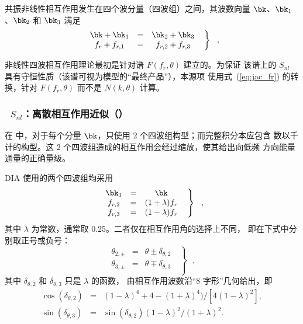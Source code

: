 
\noindent


共振非线性相互作用发生在四个波分量（四波组）之间，其波数向量
$\bk$、$\bk_1$、$\bk_2$ 和 $\bk_3$ 满足
\begin{equation} \left .
\begin{array}{ccc}
  \bk + \bk_1 & = & \bk_2 + \bk_3     \\
  f_r + f_{r,1}& =& f_{r,2} +  f_{r,3} 
\end{array} \:\:\: \right \rbrace \:\:\: , \label{eq:resonance}
\end{equation}

非线性四波相互作用理论最初是针对谱 $F(f_r ,\theta)$ 建立的。为保证
该谱上的 $S_{nl}$ 具有守恒性质（该谱可视为模型的“最终产品”），本源项
使用式~(\ref{eq:jac_fr}) 的转换，针对 $F(f_r,\theta)$ 而不是
$N(k,\theta)$ 计算。

\vsssub
\subsubsection{~$S_{nl}$：离散相互作用近似（\dia）} \label{sec:NL1}
\vsssub




在 \dia 中，对于每个分量 $\bk$，只使用 2 个四波组构型；而完整积分本应包含
数以千计的构型。这 2 个四波组造成的相互作用会经过缩放，使其给出向低频
方向能量通量的正确量级。

DIA 使用的两个四波组均采用
\begin{equation} \left .
\begin{array}{ccc}
  \bk_1 & = & \bk\\
  f_{r,2}  & = & (1+\lambda)f_{r}    \\
  f_{r,3}  & = & (1-\lambda)f_{r} 
\end{array} \:\:\: \right \rbrace \:\:\: , \label{eq:DIAchoice}
\end{equation}
其中 $\lambda$ 为常数，通常取 0.25。二者仅在相互作用角的选择上不同，
即在下式中分别取正号或负号：
\begin{equation} \left .
\begin{array}{ccc}
  \theta_{2,\pm}  & = & \theta \pm \delta_{\theta,2}   \\
 \theta_{3,\pm}  & = & \theta \mp  \delta_{\theta,3}   \\
 \end{array} \:\:\: \right \rbrace \:\:\: , \label{eq:DIAangles}
\end{equation}
其中 $\delta_{\theta,2}$ 和 $\delta_{\theta,3}$ 只是 $\lambda$ 的函数，
由相互作用波数沿“8 字形”几何给出，即
\begin{eqnarray}
\cos(\delta_{\theta,2})&=&(1-\lambda)^4+4-(1+\lambda)^4)/[4(1-\lambda)^2], \\
\sin(\delta_{\theta,3})&=&\sin(\delta_{\theta,2}) (1-\lambda)^2/(1+\lambda)^2.
\end{eqnarray}

